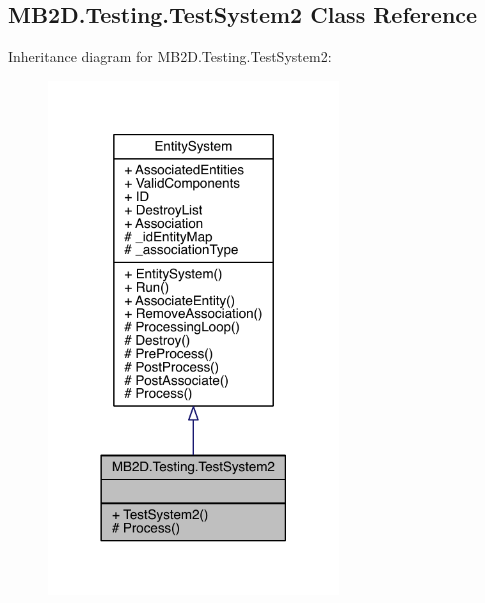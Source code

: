 \hypertarget{class_m_b2_d_1_1_testing_1_1_test_system2}{}\subsection{M\+B2\+D.\+Testing.\+Test\+System2 Class Reference}
\label{class_m_b2_d_1_1_testing_1_1_test_system2}


Inheritance diagram for M\+B2\+D.\+Testing.\+Test\+System2\+:
\nopagebreak
\begin{figure}[H]
\begin{center}
\leavevmode
\includegraphics[width=218pt]{class_m_b2_d_1_1_testing_1_1_test_system2__inherit__graph}
\end{center}
\end{figure}



